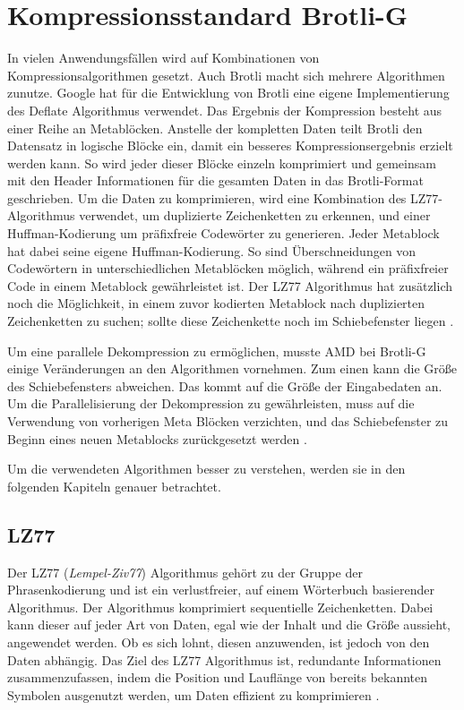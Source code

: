 \section{Kompressionsstandard Brotli-G}
\label{sec:brotlig}
In vielen Anwendungsfällen wird auf Kombinationen von Kompressionsalgorithmen gesetzt.
Auch Brotli macht sich mehrere Algorithmen zunutze.
Google hat für die Entwicklung von Brotli eine eigene Implementierung des Deflate Algorithmus verwendet.
Das Ergebnis der Kompression besteht aus einer Reihe an Metablöcken.
Anstelle der kompletten Daten teilt Brotli den Datensatz in logische Blöcke ein, damit ein besseres Kompressionsergebnis erzielt werden kann.
So wird jeder dieser Blöcke einzeln komprimiert und gemeinsam mit den Header Informationen für die gesamten Daten in das Brotli-Format geschrieben.
Um die Daten zu komprimieren, wird eine Kombination des LZ77-Algorithmus verwendet, um duplizierte Zeichenketten zu erkennen, und einer Huffman-Kodierung um präfixfreie Codewörter zu generieren.
Jeder Metablock hat dabei seine eigene Huffman-Kodierung.
So sind Überschneidungen von Codewörtern in unterschiedlichen Metablöcken möglich, während ein präfixfreier Code in einem Metablock gewährleistet ist.
Der LZ77 Algorithmus hat zusätzlich noch die Möglichkeit, in einem zuvor kodierten Metablock nach duplizierten Zeichenketten zu suchen; sollte diese Zeichenkette noch im Schiebefenster liegen \cite{rfc7932}. \newline

Um eine parallele Dekompression zu ermöglichen, musste AMD bei Brotli-G einige Veränderungen an den Algorithmen vornehmen.
Zum einen kann die Größe des Schiebefensters abweichen.
Das kommt auf die Größe der Eingabedaten an.
Um die Parallelisierung der Dekompression zu gewährleisten, muss auf die Verwendung von vorherigen Meta Blöcken verzichten, und das Schiebefenster zu Beginn eines neuen Metablocks zurückgesetzt werden \cite{AMD2024}. \newline

Um die verwendeten Algorithmen besser zu verstehen, werden sie in den folgenden Kapiteln genauer betrachtet.

\subsection{LZ77}
\label{subsec:lz77}
Der LZ77 (\textit{Lempel-Ziv77}) Algorithmus gehört zu der Gruppe der Phrasenkodierung und ist ein verlustfreier, auf einem Wörterbuch basierender Algorithmus.
Der Algorithmus komprimiert sequentielle Zeichenketten.
Dabei kann dieser auf jeder Art von Daten, egal wie der Inhalt und die Größe aussieht, angewendet werden.
Ob es sich lohnt, diesen anzuwenden, ist jedoch von den Daten abhängig.
Das Ziel des LZ77 Algorithmus ist, redundante Informationen zusammenzufassen, indem die Position und Lauflänge von bereits bekannten Symbolen ausgenutzt werden, um Daten effizient zu komprimieren \cite{Strutz2009}. \newline

